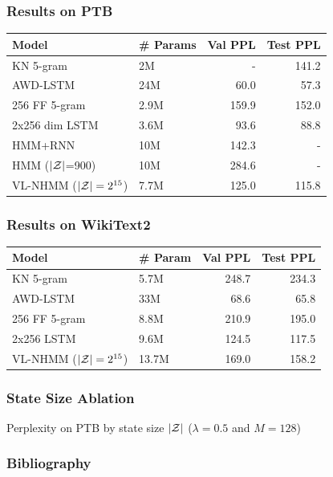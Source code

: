 \documentclass{beamer}
\begin{document}
\begin{frame}
\frametitle{Results on PTB}

\begin{table}[!t]
\centering
\begin{tabular}{llrr}
\toprule
Model & \# Params & Val PPL  & Test PPL\\
\midrule
KN 5-gram   & 2M & - & 141.2\\
AWD-LSTM  & 24M & 60.0 & 57.3\\
256 FF 5-gram  & 2.9M     & 159.9      & 152.0  \\
2x256 dim LSTM  & 3.6M     & 93.6       & 88.8   \\
HMM+RNN   & 10M & 142.3 & -\\
HMM ($|\mathcal{Z}|$=900) & 10M & 284.6 & -\\
VL-NHMM ($|\mathcal{Z}|=2^{15}$)   & 7.7M     & 125.0      & 115.8  \\
\bottomrule
\end{tabular}
\end{table}

\end{frame}

\begin{frame}
\frametitle{Results on WikiText2}

\begin{table}[!t]
\centering
\begin{tabular}{llrr}
\toprule
Model & \# Param & Val PPL & Test PPL\\
\midrule
KN 5-gram & 5.7M       & 248.7 & 234.3\\
AWD-LSTM & 33M & 68.6 & 65.8\\
256 FF 5-gram        & 8.8M    & 210.9  & 195.0\\
2x256  LSTM     & 9.6M    & 124.5  & 117.5\\
VL-NHMM ($|\mathcal{Z}|=2^{15}$)           & 13.7M   & 169.0      & 158.2\\
\bottomrule
\end{tabular}
\end{table}

\end{frame}

\begin{frame}
\frametitle{State Size Ablation}

\centering
{}

Perplexity on PTB by state size $|\mathcal{Z}|$ ($\lambda =0.5$ and $M=128$)
\end{frame}

\begin{frame}
\frametitle{Bibliography}


\end{frame}
\end{document}
